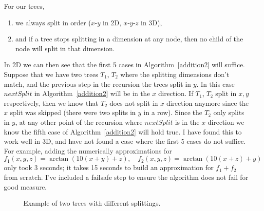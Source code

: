 \documentclass{article}
\begin{document}
For our trees,
\begin{enumerate}
\item we always split in order ($x$-$y$ in 2D, $x$-$y$-$z$ in 3D),
\item and if a tree stops splitting in a dimension at any node, then no child of the node will split in that dimension.
\end{enumerate}
In 2D we can then see that the first 5 cases in Algorithm~\ref{addition2} will suffice. Suppose that we have two trees $T_1$, $T_2$ where the splitting dimensions don't match, and the previous step in the recursion the trees split in $y$. In this case $nextSplit$ in Algorithm~\ref{addition2} will be in the $x$ direction. If $T_1$, $T_2$ split in $x,y$ respectively, then we know that $T_2$ does not split in $x$ direction anymore since the $x$ split was skipped (there were two splits in $y$ in a row). Since the $T_2$ only splits in $y$, at any other point of the recursion where $nextSplit$ is in the $x$ direction we know the fifth case of Algorithm~\ref{addition2} will hold true. I have found this to work well in 3D, and have not found a case where the first 5 cases do not suffice. For example, adding the numerically approximations for
\begin{equation}
f_1(x,y,z) = \arctan(10(x+y)+z), \quad f_2(x,y,z) = \arctan(10(x+z)+y)
\end{equation}
only took 3 seconds; it takes 15 seconds to build an approximation for $f_1+f_2$ from scratch. I've included a failsafe step to ensure the algorithm does not fail for good measure.



\begin{figure}[!htb]
\centering
{}

\caption{Example of two trees with different splittings.}
\label{bad_split_2}
\end{figure}
\end{document}
